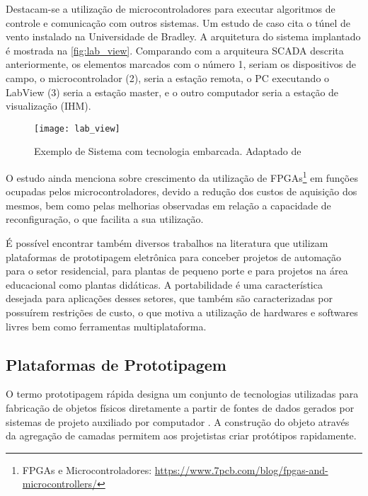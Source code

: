		Destacam-se a utilização de microcontroladores para executar algoritmos de controle e comunicação com outros sistemas. Um estudo de caso cita o túnel de vento instalado na Universidade de Bradley. A arquitetura do sistema implantado é mostrada na \autoref{fig:lab_view}. Comparando com a arquiteura SCADA descrita anteriormente, os elementos marcados com o número 1, seriam os dispositivos de campo, o microcontrolador (2), seria a estação remota, o PC executando o LabView (3) seria a estação master, e o outro computador seria a estação de visualização (IHM).
		
		\begin{figure}[!htb]	
			\captionsetup{justification=centering}
			\setlength{\belowcaptionskip}{-5pt}
			\begin{center}
				\texttt{[image: lab\_view]}  %
				\caption[Exemplo de Sistema com tecnologia embarcada]{\label{fig:lab_view}Exemplo de Sistema com tecnologia embarcada. Adaptado de \textcite{yu2011}}
			\end{center}		
		\end{figure}
	
		O estudo ainda menciona sobre crescimento da utilização de FPGAs\footnote{FPGAs e Microcontroladores: \url{https://www.7pcb.com/blog/fpgas-and-microcontrollers/}} em funções ocupadas pelos microcontroladores, devido a redução dos custos de aquisição dos mesmos, bem como pelas melhorias observadas em relação a capacidade de reconfiguração, o que facilita a sua utilização.
		
		É possível encontrar também diversos trabalhos na literatura que utilizam plataformas de prototipagem eletrônica para conceber projetos de automação para o setor residencial, para plantas de pequeno porte e para projetos na área educacional como plantas didáticas. A portabilidade é uma característica desejada para aplicações desses setores, que também são caracterizadas por possuírem restrições de custo, o que motiva a utilização de hardwares e softwares livres bem como ferramentas multiplataforma.
		
	\subsection{Plataformas de Prototipagem}
		O termo prototipagem rápida designa um conjunto de tecnologias utilizadas para fabricação de objetos físicos diretamente a partir de fontes de dados gerados por sistemas de projeto auxiliado por computador \cite{gorni2001}. A construção do objeto através da agregação de camadas permitem aos projetistas criar protótipos rapidamente.
		
